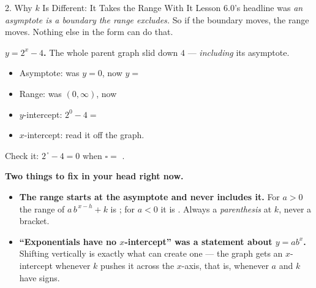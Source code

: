 \documentclass[10pt]{article}
\newcommand{\lgrid}[4]{%
  \draw[step=1, linegray!40, very thin] (#1,#3) grid (#2,#4);
  \draw[->, semithick, charcoal] (#1,0)--(#2,0) node[below right, font=\scriptsize]{$x$};
  \draw[->, semithick, charcoal] (0,#3)--(0,#4) node[left, font=\scriptsize]{$y$};}
\newcommand{\expgraph}[6]{\draw[very thick, forest, domain=#5:#6, samples=140, smooth]
  plot (\x,{(#1)*exp((#2)*((\x)-(#3)))+(#4)});}
\newcommand{\hasym}[3]{\draw[navy, dashed, semithick] (#1,#3)--(#2,#3);}
\begin{document}
\begin{notesbox}{2. Why $k$ Is Different: It Takes the Range With It}
Lesson 6.0's headline was \emph{an asymptote is a boundary the range excludes.} So if the boundary
moves, the range moves. Nothing else in the form can do that.
\begin{center}
\begin{minipage}[c]{0.44\linewidth}
\centering
{}
\end{minipage}
\begin{minipage}[c]{0.52\linewidth}
\small
\textbf{$y=2^{x}-4$.} The whole parent graph slid down $4$ --- \emph{including} its asymptote.
\begin{itemize}[leftmargin=1.3em, itemsep=3pt]
  \item Asymptote: was $y=0$, now $y=$ 
  \item Range: was $(0,\infty)$, now 
  \item $y$-intercept: $2^{0}-4=$ 
  \item $x$-intercept: read it off the graph. 
\end{itemize}
Check it: $2^{\,\square}-4=0$ when $\square=$ . \checkmark
\end{minipage}
\end{center}

\vspace{3pt}
\begin{tcolorbox}[colback=redbg, colframe=redacc, boxrule=0.8pt, arc=1.5mm,
    left=2.5mm, right=2.5mm, top=1.5mm, bottom=1.5mm]
\textbf{Two things to fix in your head right now.}
\begin{itemize}[leftmargin=1.4em, itemsep=2pt]
  \item \textbf{The range starts at the asymptote and never includes it.} For $a>0$ the range of
        $a\,b^{\,x-h}+k$ is ; for $a<0$ it is . Always a
        \emph{parenthesis} at $k$, never a bracket.
  \item \textbf{``Exponentials have no $x$-intercept'' was a statement about $y=ab^{x}$.} Shifting
        vertically is exactly what can create one --- the graph gets an $x$-intercept whenever $k$
        pushes it across the $x$-axis, that is, whenever $a$ and $k$ have  signs.
\end{itemize}
\end{tcolorbox}


\end{notesbox}
\end{document}
